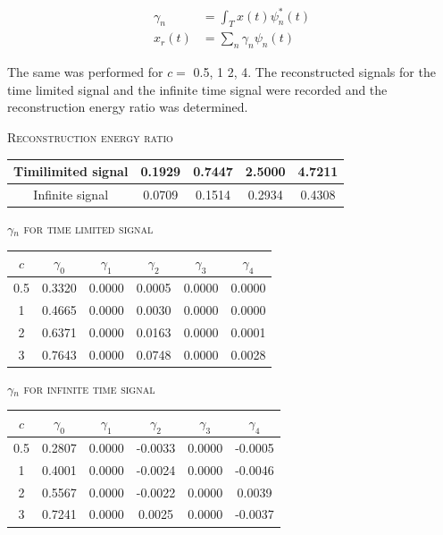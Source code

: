 \documentclass[a4paper,10pt]{article}
\begin{document}
\begin{align*}
\gamma_n &= \int_T x(t) \psi_n^* (t) \\
x_r(t) &= \sum_n \gamma_n \psi_n (t)
\end{align*}

The same was performed for $c =$ 0.5, 1 2, 4. The reconstructed signals for the time limited signal and the infinite time signal were recorded and the reconstruction energy ratio was determined.

\begin{center}
\textsc{Reconstruction energy ratio}
\end{center}

\begin{center}
\begin{tabular}{|c|c|c|c|c|}
\hline
Timilimited signal & 0.1929 & 0.7447 & 2.5000 & 4.7211 \\ \hline
Infinite signal & 0.0709 & 0.1514 & 0.2934 & 0.4308 \\ \hline
\end{tabular}
\end{center}

\begin{center}
\textsc{$\gamma_n$ for time limited signal}
\end{center}

\begin{center}
\begin{tabular}{|c|c|c|c|c|c|}
\hline
$c$ & $\gamma_0$ & $\gamma_1$ & $\gamma_2$ & $\gamma_3$ & $\gamma_4$ \\\hline
0.5 & 0.3320 & 0.0000 & 0.0005 & 0.0000 & 0.0000 \\ \hline
1   & 0.4665 & 0.0000 & 0.0030 & 0.0000 & 0.0000 \\ \hline
2   & 0.6371 & 0.0000 & 0.0163 & 0.0000 & 0.0001 \\ \hline
3   & 0.7643 & 0.0000 & 0.0748 & 0.0000 & 0.0028 \\ \hline
\end{tabular}
\end{center}

\begin{center}
\textsc{$\gamma_n$ for infinite time signal}
\end{center}

\begin{center}
\begin{tabular}{|c|c|c|c|c|c|}
\hline
$c$ & $\gamma_0$ & $\gamma_1$ & $\gamma_2$ & $\gamma_3$ & $\gamma_4$ \\\hline
0.5 & 0.2807 & 0.0000 & -0.0033 & 0.0000 & -0.0005 \\ \hline
1   & 0.4001 & 0.0000 & -0.0024 & 0.0000 & -0.0046 \\ \hline
2   & 0.5567 & 0.0000 & -0.0022 & 0.0000 & 0.0039  \\ \hline
3   & 0.7241 & 0.0000 & 0.0025  & 0.0000 & -0.0037 \\ \hline
\end{tabular}

\end{center}
\end{document}
